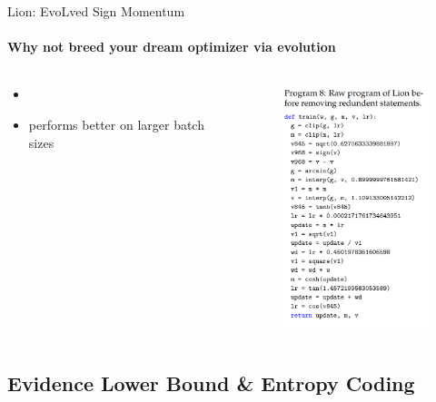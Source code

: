 \documentclass[
	11pt, %
	aspectratio=169, %
]{beamer}
\begin{document}
\begin{frame}{Lion: EvoLved Sign Momentum}
	\framesubtitle{Why not breed your dream optimizer via evolution}
	\vspace{-1em}
\begin{columns}[c] %
		\begin{column}{0.45\textwidth} %
			\begin{itemize}
					\item 
				\item performs better on larger batch sizes
			\end{itemize}
		\end{column}
		\begin{column}{0.55\textwidth} %
        	\begin{figure}
        	    \centering
                \includegraphics[width=4.4cm]{figures/raw_lion.png}
        	\end{figure}
		\end{column}
	\end{columns}
\end{frame}

\subsection{Evidence Lower Bound \& Entropy Coding}
\end{document}
